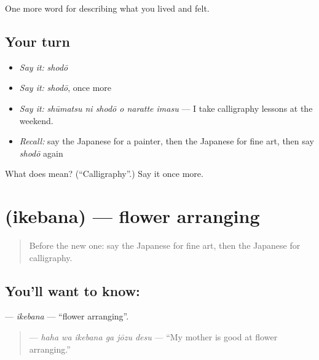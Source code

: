 \begin{grammarlens}[title={What you've built}]
One more word for describing what you lived and felt.
\end{grammarlens}

\subsection*{Your turn}
\begin{itemize}
\raggedright
  \item \emph{Say it:} \emph{shodō}
  \item \emph{Say it:} \emph{shodō}, once more
  \item \emph{Say it:} \emph{shūmatsu ni shodō o naratte imasu} — I take calligraphy lessons at the weekend.
  \item \emph{Recall:} say the Japanese for a painter, then the Japanese for fine art, then say \emph{shodō} again
\end{itemize}

\begin{tcolorbox}[breakable,colback=teal!4,colframe=teal!35!black,title={Before you move on}]
What does  mean? (\textquotedblleft{}Calligraphy\textquotedblright{}.) Say it once more.
\end{tcolorbox}
\section[\texorpdfstring{\ja{いけばな} (ikebana)}{いけばな (ikebana)}]{ (ikebana) — flower arranging}

\label{lesson:JA-C466-ikebana}



\begin{quote}
Before the new one: say the Japanese for fine art, then the Japanese for calligraphy.
\end{quote}

\subsection*{You'll want to know: }
\textbf{} — \emph{ikebana} — \textquotedblleft{}flower arranging\textquotedblright{}.

\begin{quote}
\textbf{  } — \emph{haha wa ikebana ga jōzu desu} — \textquotedblleft{}My mother is good at flower arranging.\textquotedblright{}
\end{quote}

